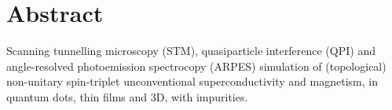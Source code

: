 \chapter*{Abstract}

\begin{doublespace}
Scanning tunnelling microscopy (STM), quasiparticle interference (QPI) and 
angle-resolved photoemission spectrocopy (ARPES) simulation of (topological)
non-unitary spin-triplet unconventional superconductivity and magnetism, in 
quantum dots, thin films and 3D, with impurities.
\end{doublespace}

